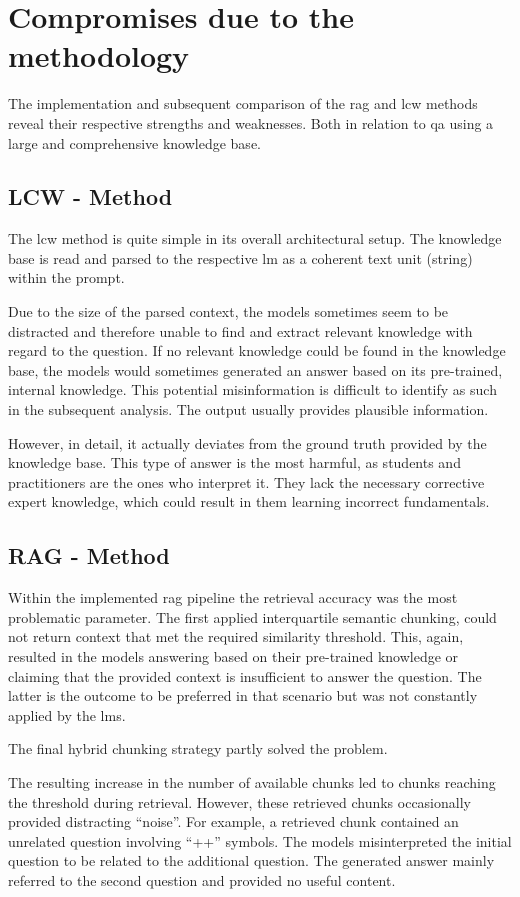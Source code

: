 \section{Compromises due to the methodology}

The implementation and subsequent comparison of the \ac{rag} and \ac{lcw} methods reveal their respective strengths and weaknesses.
Both in relation to \ac{qa} using a large and comprehensive knowledge base.
%
\subsection{LCW - Method}

The \ac{lcw} method is quite simple in its overall architectural setup.
The knowledge base is read and parsed to the respective \ac{lm} as a coherent text unit (string) within the prompt.

Due to the size of the parsed context, the models sometimes seem to be distracted and therefore unable to find and extract relevant knowledge with regard to the question.
If no relevant knowledge could be found in the knowledge base, the models would sometimes generated an answer based on its pre-trained, internal knowledge.
This potential misinformation is difficult to identify as such in the subsequent analysis.
The output usually provides plausible information.

However, in detail, it actually deviates from the ground truth provided by the knowledge base.
This type of answer is the most harmful, as students and practitioners are the ones who interpret it.
They lack the necessary corrective expert knowledge, which could result in them learning incorrect fundamentals. 
%
\subsection{RAG - Method}

Within the implemented \ac{rag} pipeline the retrieval accuracy was the most problematic parameter.
The first applied interquartile semantic chunking, could not return context that met the required similarity threshold.
This, again, resulted in the models answering based on their pre-trained knowledge or claiming that the provided context is insufficient to answer the question.
The latter is the outcome to be preferred in that scenario but was not constantly applied by the \acp{lm}.

The final hybrid chunking strategy partly solved the problem.

The resulting increase in the number of available chunks led to chunks reaching the threshold during retrieval.
However, these retrieved chunks occasionally provided distracting \enquote{noise}.
For example, a retrieved chunk contained an unrelated question involving \enquote{++} symbols.
The models misinterpreted the initial question to be related to the additional question.
The generated answer mainly referred to the second question and provided no useful content.

